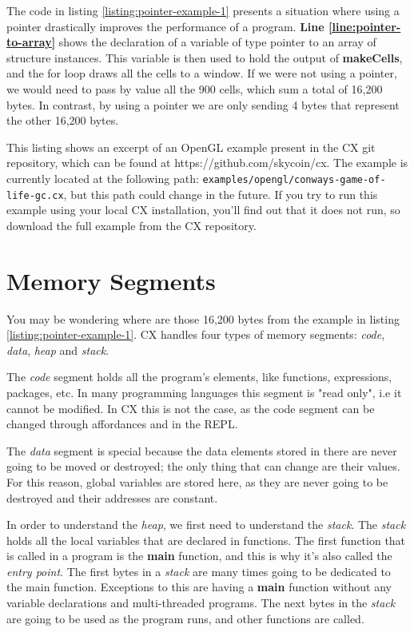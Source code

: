 \documentclass[11pt,fleqn,openany]{book} %
\begin{document}
The code in listing \ref{listing:pointer-example-1} presents a situation where using a pointer drastically improves the performance of a program. \textbf{Line \ref{line:pointer-to-array}} shows the declaration of a variable of type pointer to an array of structure instances. This variable is then used to hold the output of \textbf{makeCells}, and the for loop draws all the cells to a window. If we were not using a pointer, we would need to pass by value all the 900 cells, which sum a total of 16,200 bytes. In contrast, by using a pointer we are only sending 4 bytes that represent the other 16,200 bytes.

This listing shows an excerpt of an OpenGL example present in the CX git repository, which can be found at https://github.com/skycoin/cx. The example is currently located at the following path: \lstinline{examples/opengl/conways-game-of-life-gc.cx}, but this path could change in the future. If you try to run this example using your local CX installation, you'll find out that it does not run, so download the full example from the CX repository.

\section{Memory Segments}
\label{section:memory-segments}

You may be wondering where are those 16,200 bytes from the example in listing \ref{listing:pointer-example-1}. CX handles four types of memory segments: \emph{code}, \emph{data}, \emph{heap} and \emph{stack}.

The \emph{code} segment holds all the program's elements, like functions, expressions, packages, etc. In many programming languages this segment is "read only", i.e it cannot be modified. In CX this is not the case, as the code segment can be changed through affordances and in the REPL.

The \emph{data} segment is special because the data elements stored in there are never going to be moved or destroyed; the only thing that can change are their values. For this reason, global variables are stored here, as they are never going to be destroyed and their addresses are constant.

In order to understand the \emph{heap}, we first need to understand the \emph{stack}. The \emph{stack} holds all the local variables that are declared in functions. The first function that is called in a program is the \textbf{main} function, and this is why it's also called the \emph{entry point}. The first bytes in a \emph{stack} are many times going to be dedicated to the main function. Exceptions to this are having a \textbf{main} function without any variable declarations and multi-threaded programs. The next bytes in the \emph{stack} are going to be used as the program runs, and other functions are called.
\end{document}

